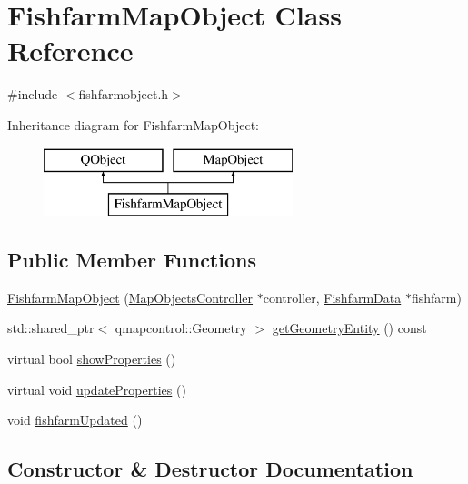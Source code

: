 \hypertarget{class_fishfarm_map_object}{}\section{Fishfarm\+Map\+Object Class Reference}
\label{class_fishfarm_map_object}


{\ttfamily \#include $<$fishfarmobject.\+h$>$}

Inheritance diagram for Fishfarm\+Map\+Object\+:\begin{figure}[H]
\begin{center}
\leavevmode
\includegraphics[height=2.000000cm]{de/d4b/class_fishfarm_map_object}
\end{center}
\end{figure}
\subsection*{Public Member Functions}
\begin{DoxyCompactItemize}
\item 
\mbox{\hyperlink{class_fishfarm_map_object_a9d5cfb4b752494d05f36ccbb2ff4a5be}{Fishfarm\+Map\+Object}} (\mbox{\hyperlink{class_map_objects_controller}{Map\+Objects\+Controller}} $\ast$controller, \mbox{\hyperlink{class_fishfarm_data}{Fishfarm\+Data}} $\ast$fishfarm)
\item 
std\+::shared\+\_\+ptr$<$ qmapcontrol\+::\+Geometry $>$ \mbox{\hyperlink{class_fishfarm_map_object_ae5940a46e28dbe1886efd6db689b996a}{get\+Geometry\+Entity}} () const
\item 
virtual bool \mbox{\hyperlink{class_fishfarm_map_object_a88d9da326b469b56a346bed0572c0ab6}{show\+Properties}} ()
\item 
virtual void \mbox{\hyperlink{class_fishfarm_map_object_a53e7378d8f4631b5c3bff739fb355674}{update\+Properties}} ()
\item 
void \mbox{\hyperlink{class_fishfarm_map_object_ab342aa49164996ee9d65c5c903f4acbb}{fishfarm\+Updated}} ()
\end{DoxyCompactItemize}


\subsection{Constructor \& Destructor Documentation}
\mbox{\label{class_fishfarm_map_object_a9d5cfb4b752494d05f36ccbb2ff4a5be}} 

